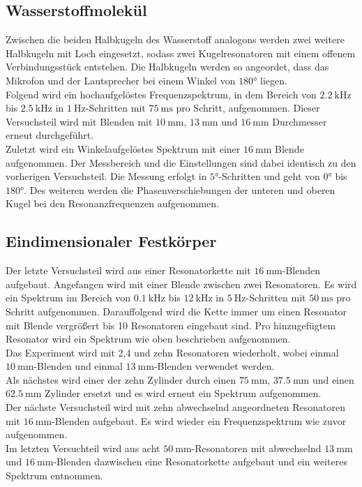 \subsection{Wasserstoffmolekül}
Zwischen die beiden Halbkugeln des Wasserstoff analogons werden zwei weitere Halbkugeln mit Loch eingesetzt, sodass zwei Kugelresonatoren mit einem offenem Verbindungsstück entstehen.
Die Halbkugeln werden so angeordet, dass das Mikrofon und der Lautsprecher bei einem Winkel von $\ang{180;;}$ liegen.
\\
Folgend wird ein hochaufgelöstes Frequenzspektrum, 
in dem Bereich von $\SI{2.2}{\kilo\hertz}$ bis $\SI{2.5}{\kilo\hertz}$ in  $\SI{1}{\hertz}$-Schritten mit $\SI{75}{\milli\second}$ pro Schritt, aufgenommen.
Dieser Versuchsteil wird mit Blenden mit $\SI{10}{\milli\meter}$, $\SI{13}{\milli\meter}$ und $\SI{16}{\milli\meter}$ Durchmesser erneut durchgeführt.
\\
Zuletzt wird ein Winkelaufgelöstes Spektrum mit einer $\SI{16}{\milli\meter}$ Blende aufgenommen. Der Messbereich und die Einstellungen sind dabei identisch zu den vorherigen Versuchsteil.
Die Messung erfolgt in $\ang{5;;}$-Schritten und geht von $\ang{0;;}$ bis $\ang{180;;}$. Des weiteren werden die Phasenverschiebungen der unteren und oberen Kugel bei den Resonanzfrequenzen aufgenommen.

\subsection{Eindimensionaler Festkörper}
Der letzte Versuchsteil wird aus einer Resonatorkette mit $\SI{16}{\milli\meter}$-Blenden aufgebaut.
Angefangen wird mit einer Blende zwischen zwei Resonatoren. Es wird ein Spektrum im Bereich von
$\SI{0.1}{\kilo\hertz}$ bis $\SI{12}{\kilo\hertz}$ in $\SI{5}{\hertz}$-Schritten mit $\SI{50}{\milli\second}$ pro Schritt aufgenommen.
Darauffolgend wird die Kette immer um einen Resonator mit Blende vergrößert bis 10 Resonatoren eingebaut sind. Pro hinzugefügtem Resonator wird ein Spektrum
wie oben beschrieben aufgenommen.
\\
Das Experiment wird mit 2,4 und zehn Resonatoren wiederholt, wobei einmal $\SI{10}{\milli\meter}$-Blenden und einmal $\SI{13}{\milli\meter}$-Blenden
verwendet werden.
\\
Als nächstes wird einer der zehn Zylinder durch einen $\SI{75}{\milli\meter}$, $\SI{37.5}{\milli\meter}$ und einen $\SI{62.5}{\milli\meter}$ Zylinder ersetzt und
es wird erneut ein Spektrum aufgenommen.
\\
Der nächste Versuchsteil wird mit zehn abwechselnd angeordneten Resonatoren mit $\SI{16}{\milli\meter}$-Blenden aufgebaut.
Es wird wieder ein Frequenzspektrum wie zuvor aufgenommen.
\\
Im letzten Versuchteil wird aus acht $\SI{50}{\milli\meter}$-Resonatoren mit abwechselnd $\SI{13}{\milli\meter}$ und $\SI{16}{\milli\meter}$-Blenden dazwischen
eine Resonatorkette aufgebaut und ein weiteres Spektrum entnommen.